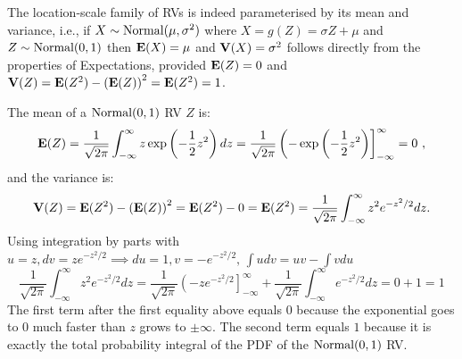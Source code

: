 \begin{example}\label{EgMeanAndVarOfNormalMuSigmaSquareRV}
The location-scale family of RVs is indeed parameterised by its mean and variance, i.e., if  $X \sim \mbox{{\rm Normal}}(\mu,\sigma^2)$ where $X=g(Z)= \sigma Z+\mu$ and $Z \sim \mbox{{\rm Normal}}(0,1)$ then $\mathbf{E}(X) = \mu$ and $\mathbf{V}(X) = \sigma^2$ follows directly from the properties of Expectations, provided $\mathbf{E}(Z)=0$ and $\mathbf{V}(Z)=\mathbf{E}(Z^2)-\left(\mathbf{E}(Z)\right)^2=\mathbf{E}(Z^2)=1$.

The mean of a $\mbox{{\rm Normal}}(0,1)$ RV $Z$ is:
\[
\mathbf{E}(Z) = \frac{1}{\sqrt{2 \pi}} \int_{-\infty}^{\infty} z \exp{\left( - \frac{1}{2} z^2 \right)}\,dz
 = \frac{1}{\sqrt{2 \pi}} \left(  -\exp{\left( - \frac{1}{2} z^2 \right)} \right]_{-\infty}^{\infty} 
= 0 \ ,
\]
and the variance is:
\[
\mathbf{V}(Z) =\mathbf{E}(Z^2)-\left(\mathbf{E}(Z)\right)^2=\mathbf{E}(Z^2)-0=\mathbf{E}(Z^2) = \frac{1}{\sqrt{2 \pi}} \int_{-\infty}^{\infty} z^2 e^{-z^2/2} dz .
\]
Using integration by parts with $u = z, dv=ze^{-z^2/2} \implies du=1, v=-e^{-z^2/2}, \, \int u dv = uv - \int v du$
\[
\frac{1}{\sqrt{2 \pi}} \int_{-\infty}^{\infty} z^2 e^{-z^2/2} dz =  \frac{1}{\sqrt{2 \pi}} \left( -z e^{-z^2/2} \right]_{-\infty}^{\infty} + \frac{1}{\sqrt{2 \pi}} \int_{-\infty}^{\infty} e^{-z^2/2} dz = 0 + 1 = 1
\]
The first term after the first equality above equals $0$ because the exponential goes to $0$ much faster than $z$ grows to $\pm \infty$. 
The second term equals $1$ because it is exactly the total probability integral of the PDF of the $\mbox{{\rm Normal}}(0,1)$ RV.
\end{example}


